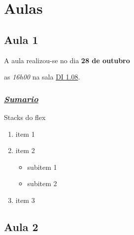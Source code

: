 \section{Aulas}


\subsection{Aula 1}


A aula realizou-se no dia \textbf{28 de outubro}

as \textit{16h00} na sala \underline{DI 1.08}.


\subsubsection{\textit{\underline{Sumario}}}

Stacks do flex


\begin{enumerate}

    \item item 1

    \item item 2

        \begin{itemize}

            \item subitem 1

            \item subitem 2

        \end{itemize}

    \item item 3

\end{enumerate}


\subsection{Aula 2}